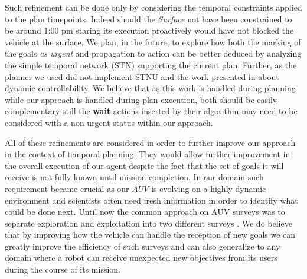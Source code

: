 Such refinement can be done only by considering the temporal
constraints applied to the plan timepoints. Indeed should the 
{\em Surface} not have been constrained to be around 1:00 pm staring
its execution proactively would have not blocked the vehicle at the
surface. We plan, in the future, to explore how both the
marking of the goals {\em as urgent} and propagation to action can be
better deduced by analyzing the simple temporal network (STN)
supporting the current plan. Further, as the planner we used did not
implement STNU and the work presented in \cite{morris01} about dynamic
controllability. We believe that as this work is handled during
planning while our approach is handled during plan execution, both
should be easily complementary still the {\bf wait} actions inserted
by their algorithm may need to be considered with a non
urgent status within our approach. 

All of these refinements are considered in order to further improve
our approach in the context of temporal planning. They would allow
further improvement in the overall execution of our agent despite the fact
that the set of goals it will receive is not fully known until mission 
completion. In our domain such requirement became crucial as our $AUV$
is evolving on a highly dynamic environment and scientists often need
fresh information in order to identify what could be done next. Until
now the common approach on AUV surveys was to separate exploration and
exploitation into two different surveys \cite{Yoerger01012007}. We do
believe that by improving how the vehicle can handle the reception of
new goals we can greatly improve the efficiency of such surveys and can
also generalize to any domain where a robot can receive unexpected
new objectives from its users during the course of its mission.






